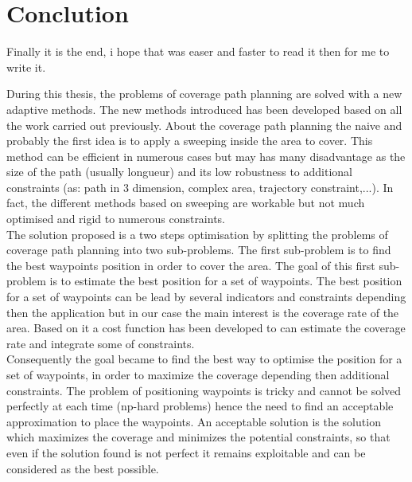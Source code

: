 \chapter{Conclution}\label{chap:Conclu}

\minitoc


Finally it is the end, i hope that was easer and faster to read it then for me to write it.

During this thesis, the problems of coverage path planning are solved with a new adaptive methods. The new methods introduced has been developed based on all the work carried out previously. 
About the coverage path planning the naive and probably the first idea is to apply a sweeping inside the area to cover. This method can be efficient in numerous cases but may has many disadvantage as the size of the path (usually longueur) and its low robustness to additional constraints (as: path in 3 dimension, complex area, trajectory constraint,...). In fact,  the different methods based on sweeping are workable but not much optimised and rigid to numerous constraints. \\
The solution proposed is a two steps optimisation by splitting the problems of coverage path planning into two sub-problems. 
The first sub-problem is to find the best waypoints position in order to cover the area. 
The goal of this first sub-problem is to estimate the best position for a set of waypoints. 
The best position for a set of waypoints can be lead by several indicators and constraints depending then the application but in our case the main interest is the coverage rate of the area. Based on it a cost function has been developed to can estimate the coverage rate and integrate some of constraints.\\
Consequently the goal became to find the best way to optimise the position for a set of waypoints, in order to maximize the coverage depending then additional constraints. The problem of positioning waypoints is tricky and cannot be solved perfectly at each time (np-hard problems) hence the need to find an acceptable approximation to place the waypoints. An acceptable solution is the solution which maximizes the coverage and minimizes the potential constraints, so that even if the solution found is not perfect it remains exploitable and can be considered as the best possible.

